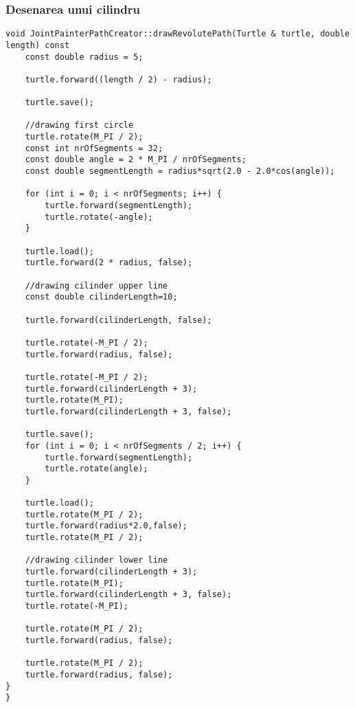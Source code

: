 \subsubsection{Desenarea unui cilindru}
\begin{lstlisting}
void JointPainterPathCreator::drawRevolutePath(Turtle & turtle, double length) const
    const double radius = 5;

    turtle.forward((length / 2) - radius);

    turtle.save();
    
    //drawing first circle
    turtle.rotate(M_PI / 2);
    const int nrOfSegments = 32;
    const double angle = 2 * M_PI / nrOfSegments;    
    const double segmentLength = radius*sqrt(2.0 - 2.0*cos(angle));

    for (int i = 0; i < nrOfSegments; i++) {
        turtle.forward(segmentLength);
        turtle.rotate(-angle);
    }

    turtle.load();
    turtle.forward(2 * radius, false);

    //drawing cilinder upper line
    const double cilinderLength=10;

    turtle.forward(cilinderLength, false);

    turtle.rotate(-M_PI / 2);
    turtle.forward(radius, false);

    turtle.rotate(-M_PI / 2);
    turtle.forward(cilinderLength + 3);
    turtle.rotate(M_PI);
    turtle.forward(cilinderLength + 3, false);

    turtle.save();
    for (int i = 0; i < nrOfSegments / 2; i++) {
        turtle.forward(segmentLength);
        turtle.rotate(angle);
    }

    turtle.load();
    turtle.rotate(M_PI / 2);
    turtle.forward(radius*2.0,false);
    turtle.rotate(M_PI / 2);

    //drawing cilinder lower line
    turtle.forward(cilinderLength + 3);
    turtle.rotate(M_PI);
    turtle.forward(cilinderLength + 3, false);
    turtle.rotate(-M_PI);

    turtle.rotate(M_PI / 2);
    turtle.forward(radius, false);

    turtle.rotate(M_PI / 2);
    turtle.forward(radius, false);
}
}
\end{lstlisting}
